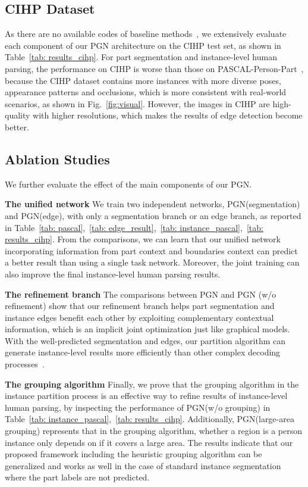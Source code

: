 \documentclass[runningheads]{llncs}
\begin{document}
\subsection{CIHP Dataset}
As there are no available codes of baseline methods~\cite{li2017holistic}, we extensively evaluate each component of our PGN architecture on the CIHP test set, as shown in Table~\ref{tab: results_cihp}. For part segmentation and instance-level human parsing, the performance on CIHP is worse than those on PASCAL-Person-Part~\cite{chen2014detect}, because the CIHP dataset contains more instances with more diverse poses, appearance patterns and occlusions, which is more consistent with real-world scenarios, as shown in Fig.~\ref{fig:visual}. However, the images in CIHP are high-quality with higher resolutions, which makes the results of edge detection become better.




\subsection{Ablation Studies}
We further evaluate the effect of the main components of our PGN.

\textbf{The unified network} We train two independent networks, PGN(segmentation) and PGN(edge), with only a segmentation branch or an edge branch, as reported in Table~\ref{tab: pascal},~\ref{tab: edge_result},~\ref{tab: instance_pascal},~\ref{tab: results_cihp}. From the comparisons, we can learn that our unified network incorporating information from part context and boundaries context can predict a better result than using a single task network. Moreover, the joint training can also improve the final instance-level human parsing results.

\textbf{The refinement branch} The comparisons between PGN and PGN (w/o refinement) show that our refinement branch helps part segmentation and instance edges benefit each other by exploiting complementary contextual information, which is an implicit joint optimization just like graphical models. With the well-predicted segmentation and edges, our partition algorithm can generate instance-level results more efficiently than other complex decoding processes~\cite{li2017holistic,Liu_2017_ICCV,Arnab_2017_CVPR}.

\textbf{The grouping algorithm} Finally, we prove that the grouping algorithm in the instance partition process is an effective way to refine results of instance-level human parsing, by inspecting the performance of PGN(w/o grouping) in Table~\ref{tab: instance_pascal},~\ref{tab: results_cihp}. Additionally, PGN(large-area grouping) represents that in the grouping algorithm, whether a region is a person instance only depends on if it covers a large area. The results indicate that our proposed framework including the heuristic grouping algorithm can be generalized and works as well in the case of standard instance segmentation where the part labels are not predicted.
\end{document}
